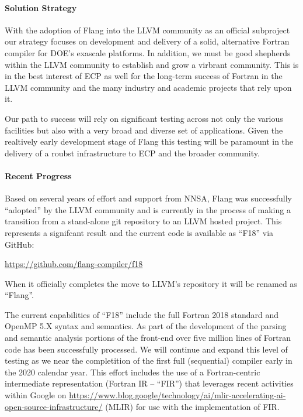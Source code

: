 \paragraph{Solution Strategy}

With the adoption of Flang into the LLVM community as an official subproject
our strategy focuses on development and delivery of a solid, alternative Fortran
compiler for DOE's exascale platforms.  In addition, we must be good shepherds
within the LLVM community to establish and grow a virbrant community. This is
in the best interest of ECP as well for the long-term success of Fortran in the
LLVM community and the many industry and academic projects that rely upon it. 

Our path to success will rely on significant testing across not only
the various facilities but also with a very broad and diverse set of applications.
Given the realtively early development stage of Flang this testing will be paramount 
in the delivery of a roubst infrastructure to ECP and the broader community. 

\paragraph{Recent Progress}

Based on several years of effort and support from NNSA, Flang was successfully ``adopted''
by the LLVM community and is currently in the process of making a transition from a
stand-alone git repository to an LLVM hosted project.  This represents a signifcant
result and the current code is available as ``F18'' via GitHub:

\begin{center}
\url{https://github.com/flang-compiler/f18}
\end{center}

When it officially completes the move to LLVM's repository it will be renamed as ``Flang''. 

The current capabilities of ``F18'' include the full Fortran 2018
standard and OpenMP 5.X syntax and semantics.  As part of the
development of the parsing and semantic analysis portions of the
front-end over five million lines of Fortran code has been
successfully processed. We will continue and expand this level of
testing as we near the completition of the first full (sequential)
compiler early in the 2020 calendar year.  This effort includes the
use of a Fortran-centric intermediate representation (Fortran IR --
``FIR'') that leverages recent activities within Google
on \href{Multi-Level Intermediate Representations}
{https://www.blog.google/technology/ai/mlir-accelerating-ai-open-source-infrastructure/}
(MLIR) for use with the implementation of FIR.

